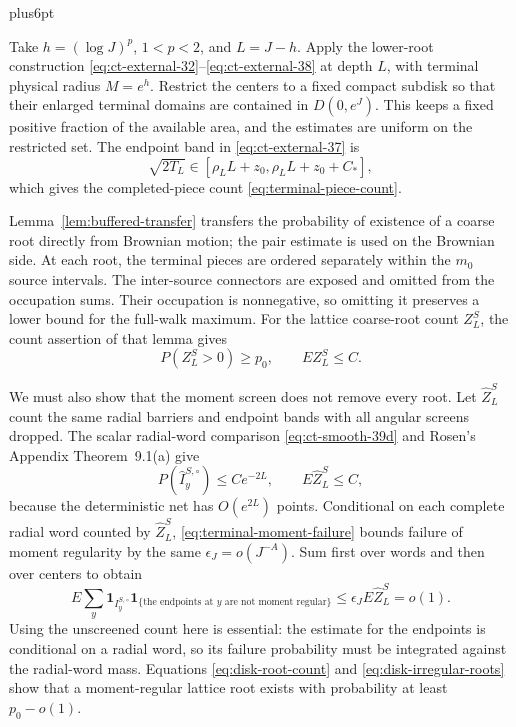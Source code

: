 \documentclass[12pt,reqno]{amsart}
\makeatletter
\theoremstyle{plain}
\theoremstyle{definition}
\theoremstyle{remark}
\renewenvironment{proof}[1][\proofname]{%
  \par
  \pushQED{\qed}%
  \normalfont
  \topsep6pt plus6pt\relax
  \trivlist
  \item[\hskip\labelsep\slshape #1\@addpunct{.}]%
  \ignorespaces
}{%
  \popQED
  \endtrivlist
  \@endpefalse
}
\DeclareRobustCommand{\qed}{%
  \leavevmode\unskip\penalty9999\hbox{}\nobreak
  \ifmmode
    \makebox[0pt][l]{\qquad\hbox{\qedsymbol}}%
  \else
    \qquad\hbox{\qedsymbol}%
  \fi
}
\renewcommand{\qedsymbol}{\rule[.47pt]{4pt}{6pt}}
\numberwithin{equation}{section}
\makeatother
\begin{document}
\begin{proof}
Take $h=(\log J)^p$, $1<p<2$, and $L=J-h$.  Apply the lower-root
construction \eqref{eq:ct-external-32}--\eqref{eq:ct-external-38} at depth $L$, with terminal physical radius
$M=e^h$.  Restrict the centers to a fixed compact subdisk so that
their enlarged terminal domains are contained in $D(0,e^J)$.
This keeps a fixed positive fraction of the available area, and the
estimates are uniform on the restricted set.  The endpoint band in
\eqref{eq:ct-external-37} is
\[
 \sqrt{2T_L}\in[\rho_LL+z_0,\rho_LL+z_0+C_*],
\]
which gives the completed-piece count
\eqref{eq:terminal-piece-count}.

Lemma~\ref{lem:buffered-transfer} transfers the probability of
existence of a coarse root directly from Brownian motion; the pair
estimate is used on the Brownian side.  At each root, the terminal
pieces are ordered separately within the $m_0$ source intervals.
The inter-source connectors are exposed and omitted from the
occupation sums.  Their occupation is nonnegative, so omitting it
preserves a lower bound for the full-walk maximum.
For the lattice coarse-root count $Z_L^S$, the count assertion of
that lemma gives
\begin{equation}
 P(Z_L^S>0)\ge p_0,\qquad EZ_L^S\le C.
 \label{eq:disk-root-count}
\end{equation}

We must also show that the moment screen does not remove every
root.  Let $\widehat Z_L^S$ count the same radial barriers and
endpoint bands with all angular screens dropped.  The scalar
radial-word comparison \eqref{eq:ct-smooth-39d} and Rosen's Appendix Theorem~9.1(a)
give
\begin{equation}
 P(\widehat I_y^{S,\circ})\le Ce^{-2L},\qquad
 E\widehat Z_L^S\le C,
 \label{eq:disk-unscreened-count}
\end{equation}
because the deterministic net has $O(e^{2L})$ points.  Conditional
on each complete radial word counted by $\widehat Z_L^S$,
\eqref{eq:terminal-moment-failure} bounds failure of moment
regularity by the same $\epsilon_J=o(J^{-A})$.  Sum first over
words and then over centers to obtain
\begin{equation}
 E\sum_y\mathbf1_{I_y^{S,\circ}}
       \mathbf1_{\{\text{the endpoints at }y\text{ are not moment regular}\}}
 \le\epsilon_J E\widehat Z_L^S=o(1).
 \label{eq:disk-irregular-roots}
\end{equation}
Using the unscreened count here is essential: the estimate for the
endpoints is conditional on a radial word, so its failure probability
must be integrated against the radial-word mass.  Equations
\eqref{eq:disk-root-count} and \eqref{eq:disk-irregular-roots}
show that a moment-regular lattice root exists with probability
at least $p_0-o(1)$.


\end{proof}
\end{document}
